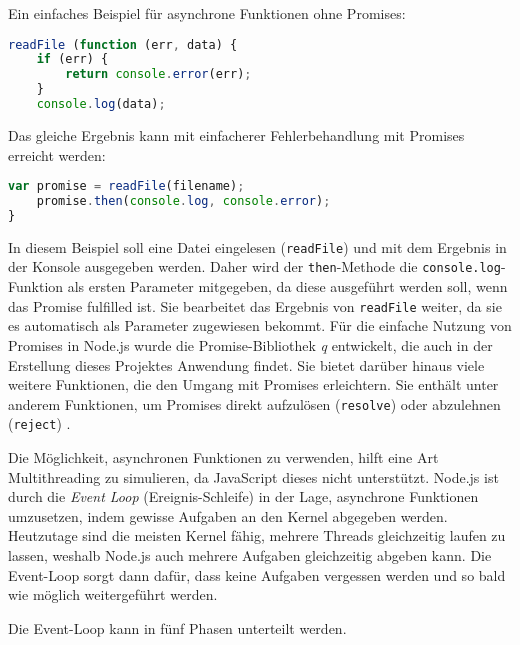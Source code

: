 Ein einfaches Beispiel für asynchrone Funktionen ohne Promises: \\

\begin{lstlisting}[title=Asynchrone Funktion ohne Promises, language=JavaScript]
readFile (function (err, data) {
	if (err) {
		return console.error(err);
	}
	console.log(data);
\end{lstlisting}

Das gleiche Ergebnis kann mit einfacherer Fehlerbehandlung mit Promises erreicht werden: \\

\begin{lstlisting}[title=Asynchrone Funktion mit Promises, language=JavaScript]
	var promise = readFile(filename);
	promise.then(console.log, console.error);
}
\end{lstlisting}

In diesem Beispiel soll eine Datei eingelesen (\texttt{readFile}) und mit dem Ergebnis in der Konsole ausgegeben werden. Daher wird der \texttt{then}-Methode die \texttt{console.log}-Funktion als ersten Parameter mitgegeben, da diese ausgeführt werden soll, wenn das Promise fulfilled ist. Sie bearbeitet das Ergebnis von \texttt{readFile} weiter, da sie es automatisch als Parameter zugewiesen bekommt.
Für die einfache Nutzung von Promises in Node.js wurde die Promise-Bibliothek \textit{q} entwickelt, die auch in der Erstellung dieses Projektes Anwendung findet. Sie bietet darüber hinaus viele weitere Funktionen, die den Umgang mit Promises erleichtern. Sie enthält unter anderem Funktionen, um Promises direkt aufzulösen (\texttt{resolve}) oder abzulehnen (\texttt{reject}) \cite{q}. 

Die Möglichkeit, asynchronen Funktionen zu verwenden, hilft eine Art Multithreading zu simulieren, da JavaScript dieses nicht unterstützt. Node.js ist durch die \textit{Event Loop} (Ereignis-Schleife) in der Lage, asynchrone Funktionen umzusetzen, indem gewisse Aufgaben an den Kernel abgegeben werden. Heutzutage sind die meisten Kernel fähig, mehrere Threads gleichzeitig laufen zu lassen, weshalb Node.js auch mehrere Aufgaben gleichzeitig abgeben kann. Die Event-Loop sorgt dann dafür, dass keine Aufgaben vergessen werden und so bald wie möglich weitergeführt werden.

Die Event-Loop kann in fünf Phasen unterteilt werden.

